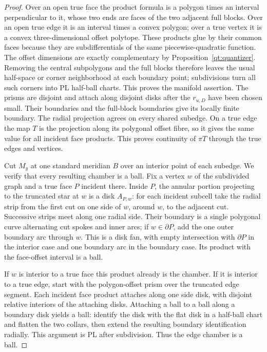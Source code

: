 \begin{proof}
Over an open true face the product formula is a polygon times an
interval perpendicular to it, whose two ends are faces of the two
adjacent full blocks.  Over an open true edge it is an interval times
a convex polygon; over a true vertex it is a convex three-dimensional
offset polytope.  These products glue by their common faces because
they are subdifferentials of the same piecewise-quadratic function.
The offset dimensions are exactly complementary by
Proposition~\ref{qt:quantizer}.  Removing the central subpolygons and
the full blocks therefore leaves the usual half-space or corner
neighborhood at each boundary point; subdivisions turn all such
corners into PL half-ball charts.  This proves the manifold assertion.
The prisms are disjoint and attach along disjoint disks after the
$r_{u,D}$ have been chosen small.  Their boundaries and the full-block
boundaries give its locally finite boundary.  The radial projection
agrees on every shared subedge.  On a true edge the map $T$ is the
projection along its polygonal offset fibre, so it gives the same
value for all incident face products.  This proves continuity of
$\pi T$ through the true edges and vertices.

Cut $M_y$ at one standard meridian $B$ over an interior point of each
subedge.  We verify that every resulting chamber is a ball.  Fix a
vertex $w$ of the subdivided graph and a true face $P$ incident there.
Inside $P$, the annular portion projecting to the truncated star at
$w$ is a disk $A_{P,w}$: for each incident subcell take the radial strip
from the first cut on one side of $w$, around $w$, to the adjacent
cut.  Successive strips meet along one radial side.  Their boundary
is a single polygonal curve alternating cut spokes and inner arcs;
if $w\in\partial P$, add the one outer boundary arc through $w$.
This is a disk fan, with empty intersection with $\partial P$ in the
interior case and one boundary arc in the boundary case.
Its product with the face-offset interval is a ball.

If $w$ is interior to a true face this product already is the chamber.
If it is interior to a true edge, start with the polygon-offset prism
over the truncated edge segment.  Each incident face product attaches
along one side disk, with disjoint relative interiors of the attaching
disks.  Attaching a ball to a ball along a boundary disk yields a ball:
identify the disk with the flat disk in a half-ball chart and flatten
the two collars, then extend the resulting boundary identification
radially.  This argument is PL after subdivision.  Thus the edge
chamber is a ball.


\end{proof}
